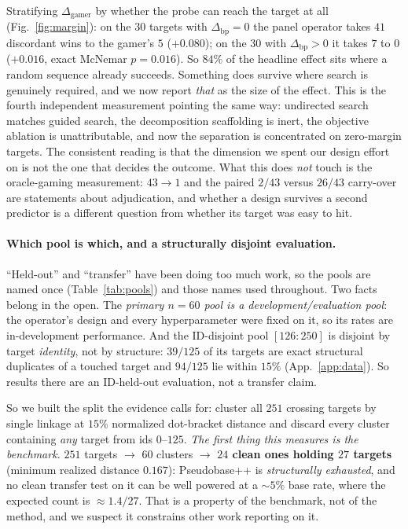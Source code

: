 \documentclass[11pt]{article}
\begin{document}
Stratifying $\Delta_{\mathrm{gamer}}$ by whether the probe can reach the target at all (Fig.~\ref{fig:margin}): on the $30$ targets
with $\Delta_{\mathrm{bp}}=0$ the panel operator takes $41$ discordant wins to the gamer's $5$
(${+}0.080$); on the $30$ with $\Delta_{\mathrm{bp}}>0$ it takes $7$ to $0$ (${+}0.016$, exact McNemar
$p{=}0.016$). So $84\%$ of the headline effect sits where a random sequence already succeeds. Something does
survive where search is genuinely required, and we now report \emph{that} as the size of the effect. This is
the fourth independent measurement pointing the same way: undirected search matches guided search, the
decomposition scaffolding is inert, the objective ablation is unattributable, and now the separation is
concentrated on zero-margin targets. The consistent reading is that the dimension we spent our design effort
on is not the one that decides the outcome. What this does \emph{not} touch is the oracle-gaming measurement:
$43\!\to\!1$ and the paired $2/43$ versus $26/43$ carry-over are statements about adjudication, and whether a
design survives a second predictor is a different question from whether its target was easy to hit.

\paragraph{Which pool is which, and a structurally disjoint evaluation.} ``Held-out'' and ``transfer'' have
been doing too much work, so the pools are named once (Table~\ref{tab:pools}) and those names used throughout.
Two facts belong in the open. The \emph{primary $n{=}60$ pool is a development/evaluation pool}: the
operator's design and every hyperparameter were fixed on it, so its rates are in-development performance. And
the ID-disjoint pool $[126{:}250]$ is disjoint by target \emph{identity}, not by structure: $39/125$ of its
targets are exact structural duplicates of a touched target and $94/125$ lie within $15\%$
(App.~\ref{app:data}). So results there are an ID-held-out evaluation, not a transfer claim.

So we built the split the evidence calls for: cluster all $251$ crossing targets by single linkage at $15\%$
normalized dot-bracket distance and discard every cluster containing \emph{any} target from ids $0$--$125$.
\emph{The first thing this measures is the benchmark.} $251$ targets $\to$ $60$ clusters $\to$ \textbf{$24$
clean ones holding $27$ targets} (minimum realized distance $0.167$): Pseudobase++ is \emph{structurally
exhausted}, and no clean transfer test on it can be well powered at a $\sim\!5\%$ base rate, where the
expected count is $\approx\!1.4/27$. That is a property of the benchmark, not of the method, and we suspect it
constrains other work reporting on it.
\end{document}
